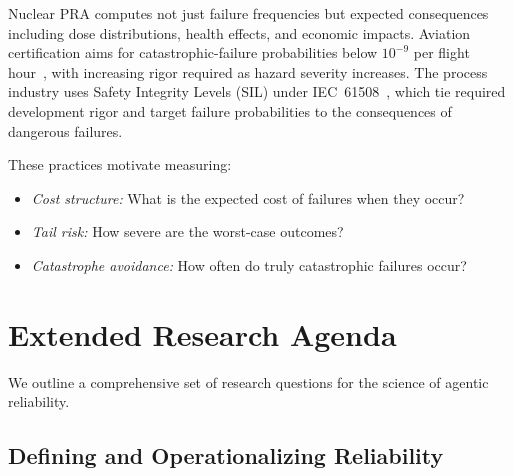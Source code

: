 \documentclass[11pt]{article}
\begin{document}
Nuclear PRA computes not just failure frequencies but expected consequences including dose distributions, health effects, and economic impacts.
Aviation certification aims for catastrophic-failure probabilities below $10^{-9}$ per flight hour~\citep{ARP4754A}, with increasing rigor required as hazard severity increases.
The process industry uses Safety Integrity Levels (SIL) under IEC~61508~\citep{IEC61508}, which tie required development rigor and target failure probabilities to the consequences of dangerous failures.

These practices motivate measuring:
\begin{itemize}[leftmargin=*, topsep=2pt]
    \item \emph{Cost structure:} What is the expected cost of failures when they occur?
    \item \emph{Tail risk:} How severe are the worst-case outcomes?
    \item \emph{Catastrophe avoidance:} How often do truly catastrophic failures occur?
\end{itemize}

\section{Extended Research Agenda}
\label{appendix:agenda}

We outline a comprehensive set of research questions for the science of agentic reliability.

\subsection{Defining and Operationalizing Reliability}
\end{document}
